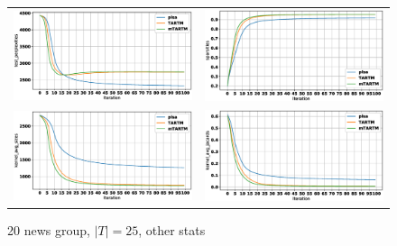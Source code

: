 \documentclass[12pt]{article}
\begin{document}
\begin{figure}[htb]
\centering
  \begin{tabular}{@{}cc@{}}
    \includegraphics[width=.5\linewidth]{pictures/20news_25t_test_perplexities.eps} &
    \includegraphics[width=.5\linewidth]{pictures/20news_25t_sparsities.eps} \\
    \includegraphics[width=.5\linewidth]{pictures/20news_25t_kernel_avg_sizes.eps} &
    \includegraphics[width=.5\linewidth]{pictures/20news_25t_kernel_avg_jacards.eps} \\
  \end{tabular}
  \caption{20 news group, $|T| = 25$, other stats}
\end{figure}
\end{document}
